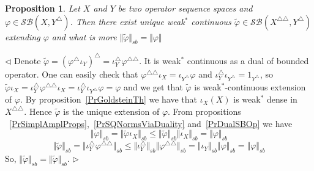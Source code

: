 \documentclass[12pt]{article}
\newtheorem{proposition}[theorem]{Proposition}
\newenvironment{proof}{\par $\triangleleft$}{$\triangleright$}
\begin{document}
\begin{proposition}\label{PrWStarContExtSBOp} Let $X$ and $Y$ be two operator 
sequence spaces and $\varphi\in \mathcal{SB}(X,Y^\triangle)$. Then there 
exist unique weak${}^*$ continuous 
$\widetilde{\varphi}\in\mathcal{SB}(X^{\triangle\triangle},Y^\triangle)$ 
extending $\varphi$ and what is more 
$\Vert\widetilde{\varphi}\Vert_{sb}=\Vert\varphi\Vert$ 
\end{proposition}
\begin{proof} Denote 
$\widetilde{\varphi}
={(\varphi^\triangle\iota_Y)}^\triangle
=\iota_{Y}^\triangle\varphi^{\triangle\triangle}$. It is weak${}^*$ continuous 
as a dual of bounded operator. One can easily check that 
$\varphi^{\triangle\triangle}\iota_X=\iota_{Y^\triangle}\varphi$ and 
$\iota_Y^\triangle\iota_{Y^\triangle}=1_{Y^\triangle}$, so 
$\widetilde{\varphi}\iota_X
=\iota_{Y}^\triangle\varphi^{\triangle\triangle}\iota_X
=\iota_{Y}^\triangle\iota_{Y^\triangle}\varphi
=\varphi$ and we get that $\widetilde{\varphi}$ is weak${}^*$-continuous 
extension of $\varphi$. By proposition~\ref{PrGoldsteinTh} we have that 
$\iota_X(X)$ is weak${}^*$ dense in $X^{\triangle\triangle}$. Hence 
$\widetilde{\varphi}$ is the unique extension of  $\varphi$. From propositions 
~\ref{PrSimplAmplProps},~\ref{PrSQNormsViaDuality} and~\ref{PrDualSBOp} we have
$$
\Vert\varphi\Vert_{sb} =\Vert\widetilde{\varphi}\iota_X\Vert_{sb}
\leq\Vert\widetilde{\varphi}\Vert_{sb}\Vert\iota_X\Vert_{sb}
=\Vert\varphi\Vert_{sb}
$$
$$
\Vert\widetilde{\varphi}\Vert_{sb}
=\Vert\iota_{Y}^\triangle\varphi^{\triangle\triangle}\Vert_{sb}
\leq\Vert\iota_{Y}^\triangle\Vert_{sb}
\Vert\varphi^{\triangle\triangle}\Vert_{sb}
=\Vert\iota_{Y}\Vert_{sb}\Vert\varphi\Vert_{sb} =\Vert\varphi\Vert_{sb}
$$
So, $\Vert\widetilde{\varphi}\Vert_{sb}=\Vert\widetilde{\varphi}\Vert_{sb}$.
\end{proof}
\end{document}
